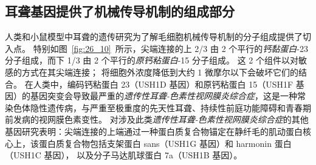 \subsection{耳聋基因提供了机械传导机制的组成部分}

人类和小鼠模型中耳聋的遗传研究为了解毛细胞机械传导机制的分子组成提供了切入点。
特别如图~\ref{fig:26_10}~所示，尖端连接的上 2/3 由 2 个平行的\textit{钙黏蛋白}-23 分子组成，而下 1/3 由 2 个平行的\textit{原钙粘蛋白}-15 分子组成。
这 2 个组件以对敏感的方式在其尖端连接；
将细胞外浓度降低到大约 1 微摩尔以下会破坏它们的结合。
在人类中，编码钙粘蛋白 23（USH1D 基因）和原钙粘蛋白 15（USH1F 基因）的基因突变会导致最严重的\textit{遗传性耳聋-色素性视网膜炎综合症}，这是一种常染色体隐性遗传病，与严重至极重度的先天性耳聋、持续性前庭功能障碍和青春期前发病的视网膜色素变性。
对涉及此类\textit{遗传性耳聋-色素性视网膜炎综合症}的其他基因研究表明：尖端连接的上端通过一种蛋白质复合物锚定在静纤毛的肌动蛋白核心上，该蛋白质复合物包括支架蛋白 sans（USH1G 基因）和 harmonin 蛋白（USH1C 基因）， 以及分子马达肌球蛋白 7a（USH1B 基因）。


